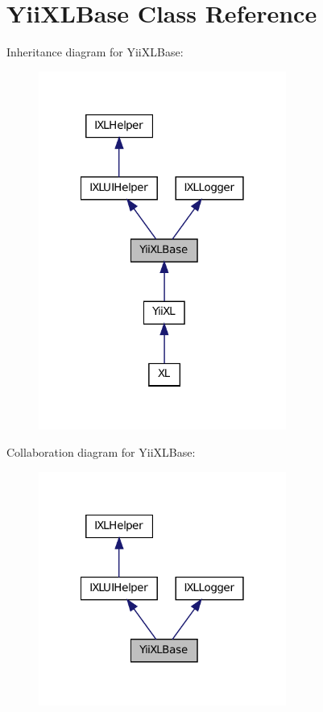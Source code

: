 \hypertarget{classYiiXLBase}{
\section{YiiXLBase Class Reference}
\label{classYiiXLBase}
}


Inheritance diagram for YiiXLBase:\nopagebreak
\begin{figure}[H]
\begin{center}
\leavevmode
\includegraphics[width=230pt]{classYiiXLBase__inherit__graph}
\end{center}
\end{figure}


Collaboration diagram for YiiXLBase:\nopagebreak
\begin{figure}[H]
\begin{center}
\leavevmode
\includegraphics[width=230pt]{classYiiXLBase__coll__graph}
\end{center}
\end{figure}
